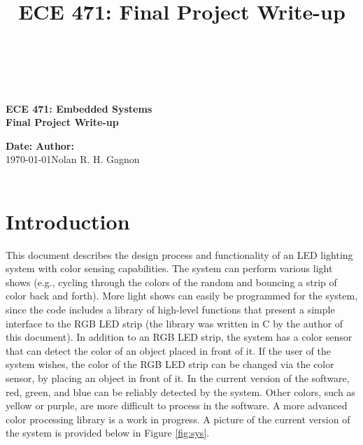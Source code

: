 \documentclass{article}
\title{ECE 471: Final Project Write-up}
\begin{document}
\begin{center}
\hrulefill \\
\vspace{-0.7cm}
\hrulefill \\
\vspace{-0.3cm}

\begin{Large}
\textbf{ECE 471:  Embedded Systems} \\
\textbf{Final Project Write-up} \\
\end{Large}
\begin{large}
\end{large}
\vspace{-7mm}
\noindent \textbf{Date:} \hfill \textbf{Author:}\\
\noindent\today \hfill Nolan R. H. Gagnon \\

\vspace{-0.4cm}
\hrulefill \\
\vspace{-0.7cm}
\hrulefill
\end{center}

\vspace{3mm}

\section{Introduction}

This document describes the design process and functionality of an LED lighting system with color sensing capabilities.  The system can perform various light shows (e.g., cycling through the colors of the random and bouncing a strip of color back and forth).  More light shows can easily be programmed for the system, since the code includes a library of high-level functions that present a simple interface to the RGB LED strip (the library was written in C by the author of this document).  In addition to an RGB LED strip, the system has a color sensor that can detect the color of an object placed in front of it.  If the user of the system wishes, the color of the RGB LED strip can be changed via the color sensor, by placing an object in front of it.  In the current version of the software, red, green, and blue can be reliably detected by the system.  Other colors, such as yellow or purple, are more difficult to process in the software.  A more advanced color processing library is a work in progress.  A picture of the current version of the system is provided below in Figure \ref{fig:sys}.
\end{document}
